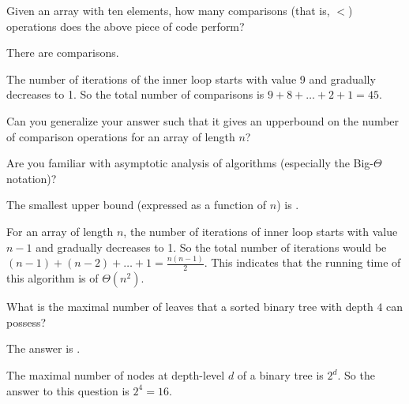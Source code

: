 \documentclass{ximera}
\begin{document}
\begin{question}
Given an array with ten elements, how many comparisons (that is, $<$)
operations does the above piece of code perform?
\begin{solution}
There are  comparisons.
\end{solution}  
The number of iterations of the inner loop starts with value 9 and
gradually decreases to 1. So the total number of comparisons is $ 9 +
8 + \ldots + 2 + 1 = 45$.
\end{question}

\begin{question}
Can you generalize your answer such that it gives an upperbound on the
number of comparison operations for an array of length $n$?
\begin{solution}
\begin{hint}
Are you familiar with asymptotic analysis of algorithms (especially
the Big-$\Theta$ notation)?
\end{hint}
The smallest upper bound (expressed as a function of $n$) is
.
\end{solution}
For an array of length $n$, the number of iterations of inner loop
starts with value $n-1$ and gradually decreases to 1. So the total
number of iterations would be $(n-1) + (n-2) + \ldots + 1 =
\frac{n(n-1)}{2}$. This indicates that the running time of this
algorithm is of $\Theta(n^2)$.
\end{question}


\begin{question}
What is the maximal number of leaves that a sorted binary tree with depth $4$ can possess?
\begin{solution}
The answer is .
\end{solution}
The maximal number of nodes at depth-level $d$ of a binary tree is $2^d$. So the answer to this question is $2^4 = 16$. 
\end{question}
\end{document}
